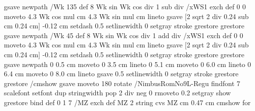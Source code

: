 {{  gsave
              newpath /Wk 135 def
               {8 Wk sin Wk cos div 1 sub div} /xWS1 exch def
               0 0 moveto
               4.3 Wk cos mul cm 4.3 Wk sin mul cm lineto
               gsave
                 [2 sqrt 2 div 0.24 sub cm 0.24 cm] -0.12 cm setdash
                 0.5 setlinewidth
                 0 setgray stroke
              grestore
  grestore
 gsave
              newpath /Wk 45 def
               {8 Wk sin Wk cos div 1 add div} /xWS1 exch def
               0 0 moveto
               4.3 Wk cos mul cm 4.3 Wk sin mul cm lineto
             gsave
               [2 sqrt 2 div 0.24 sub cm 0.24 cm] -0.12 cm setdash
               0.5 setlinewidth
               0 setgray stroke
             grestore
 grestore
  gsave
              newpath
              0 0.5 cm moveto
              0 3.5 cm lineto
              0 5.1 cm moveto
              0 6.0 cm lineto
              0 6.4 cm moveto
              0 8.0 cm lineto
              gsave
              0.5 setlinewidth
               0 setgray stroke
              grestore
  grestore
  /cmshow {%
                      gsave
                            moveto 180 rotate  %
                            /NimbusRomNo9L-Regu findfont 7 scalefont setfont
                            dup %
                            stringwidth pop 2 div neg 0 %
                            rmoveto 0.2 setgray show
                      grestore
                 } bind def
      0 1 7 { /MZ exch def MZ 2 string cvs MZ cm 0.47 cm cmshow } for %
}}
